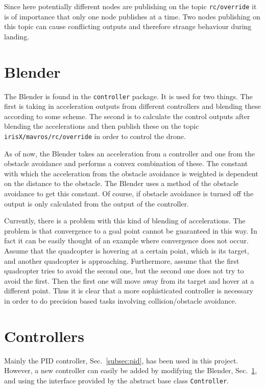 \documentclass[titlepage,11pt,a4paper]{article}
\begin{document}
Since here potentially different nodes are publishing on the topic
\texttt{rc/override} it is of importance that only one node publishes
at a time. Two nodes publishing on this topic can cause conflicting
outputs and therefore strange behaviour during landing.

\section{Blender}
\label{sec:blender}

The Blender is found in the \texttt{controller} package. It is used
for two things. The first is taking in acceleration outputs from
different controllers and blending these according to some scheme. The
second is to calculate the control outputs after blending the
accelerations and then publish these on the topic
\texttt{irisX/mavros/rc/override} in order to control the drone.

As of now, the Blender takes an acceleration from a controller and one
from the obstacle avoidance and performs a convex combination of
these. The constant with which the acceleration from the obstacle
avoidance is weighted is dependent on the distance to the
obstacle. The Blender uses a method of the obstacle avoidance to get
this constant. Of course, if obstacle avoidance is turned off the
output is only calculated from the output of the controller.

Currently, there is a problem with this kind of blending of
accelerations. The problem is that convergence to a goal point cannot
be guaranteed in this way. In fact it can be easily thought of an
example where convergence does not occur. Assume that the quadcopter
is hovering at a certain point, which is its target, and another
quadcopter is approaching. Furthermore, assume that the first
quadcopter tries to avoid the second one, but the second one does not
try to avoid the first. Then the first one will move away from its
target and hover at a different point. Thus it is clear that a more
sophisticated controller is necessary in order to do precision based
tasks involving collision/obstacle avoidance.


\section{Controllers}
\label{sec:controllers}
Mainly the PID controller, Sec.~\ref{subsec:pid}, has been used in
this project. However, a new controller can easily be added by
modifying the Blender, Sec.~\ref{sec:blender}, and using the interface
provided by the abstract base class \texttt{Controller}.
\end{document}
